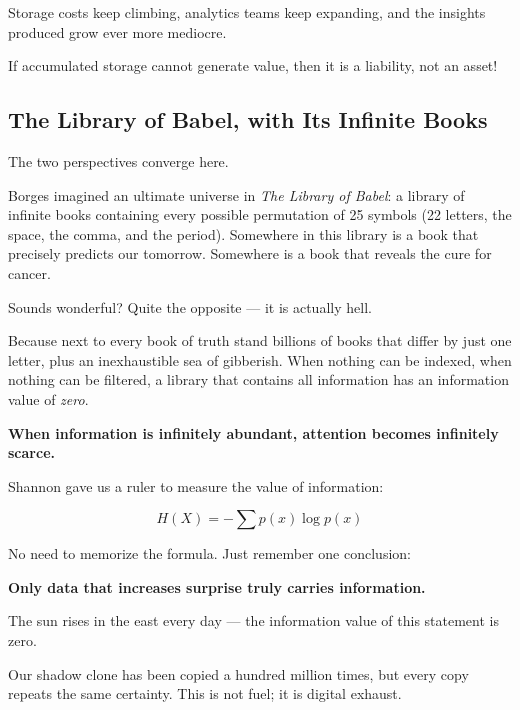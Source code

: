 Storage costs keep climbing, analytics teams keep expanding, and the insights produced grow ever more mediocre.

\begin{importantbox}
If accumulated storage cannot generate value, then it is a liability, not an asset!
\end{importantbox}

\subsection{The Library of Babel, with Its Infinite Books}

The two perspectives converge here.

Borges imagined an ultimate universe in \emph{The Library of Babel}: a library of infinite books containing every possible permutation of 25 symbols (22 letters, the space, the comma, and the period). Somewhere in this library is a book that precisely predicts our tomorrow. Somewhere is a book that reveals the cure for cancer.

\vspace{1em}

Sounds wonderful? Quite the opposite --- it is actually hell.

Because next to every book of truth stand billions of books that differ by just one letter, plus an inexhaustible sea of gibberish. When nothing can be indexed, when nothing can be filtered, a library that contains all information has an information value of \emph{zero}.

\begin{importantbox}
    \textbf{When information is infinitely abundant, attention becomes infinitely scarce.}
\end{importantbox}


Shannon gave us a ruler to measure the value of information:

\begin{equation*}
H(X) = - \sum p(x) \log p(x)
\end{equation*}

No need to memorize the formula. Just remember one conclusion:

\textbf{Only data that increases surprise truly carries information.}

\vspace{1em}

The sun rises in the east every day --- the information value of this statement is zero.

Our shadow clone has been copied a hundred million times, but every copy repeats the same certainty. This is not fuel; it is digital exhaust.

